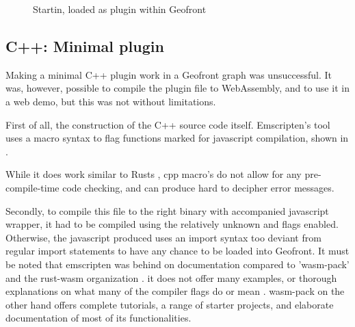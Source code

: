 \begin{figure}
\begin{subfigure}[b]{0.90\linewidth}
  \end{subfigure}%
  \caption[Types of \ac{vpl}s]{Startin, loaded as plugin within Geofront}%
  \label{fig:startin-plugin}
  \end{figure}

\subsection{C++: Minimal plugin}  


Making a minimal C++ plugin work in a Geofront graph was unsuccessful.
It was, however, possible to compile the plugin file to WebAssembly, and to use it in a web demo, but this was not without limitations. 

First of all, the construction of the C++ source code itself.
Emscripten's  tool uses a macro syntax to flag functions marked for javascript compilation, shown in . 

While it does work similar to Rusts , cpp macro's do not allow for any pre-compile-time code checking, and can produce hard to decipher error messages. 

Secondly, to compile this file to the right binary with accompanied javascript wrapper, it had to be compiled using the relatively unknown  and  flags enabled.
Otherwise, the javascript produced uses an import syntax too deviant from regular import statements to have any chance to be loaded into Geofront. 
It must be noted that emscripten was behind on documentation compared to 'wasm-pack' and the rust-wasm organization \citep{contributors_wasm-pack_2022}. 
it does not offer many examples, or thorough explanations on what many of the compiler flags do or mean \citep{emscripten_organization_emscripten_2022}.
wasm-pack on the other hand offers complete tutorials, a range of starter projects, and elaborate documentation of most of its functionalities. 

